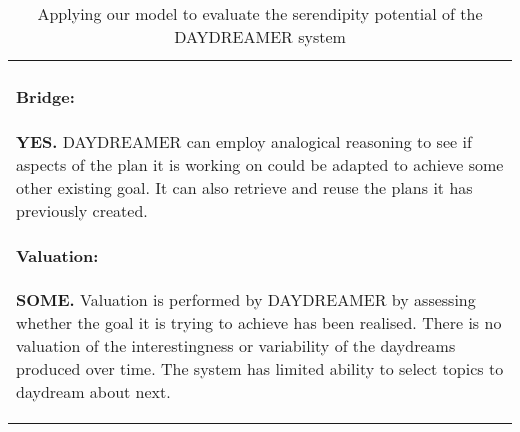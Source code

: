 \begin{table}
\begin{mdframed}[innertopmargin=-10pt]
\begin{tabular}{p{}}
\paragraph{Bridge:}
\textbf{YES.}  {\sf DAYDREAMER} can employ analogical reasoning to see
if aspects of the plan it is working on could be adapted to achieve
some other existing goal.  It can also retrieve and reuse the plans
it has previously created.
\paragraph{Valuation:}
\textbf{SOME.} Valuation is performed by {\sf DAYDREAMER} by assessing whether
the goal it is trying to achieve has been realised.  There is no valuation of the interestingness
or variability of the daydreams produced over time. 
The system has limited ability to select topics to daydream about next.
\end{tabular}
\end{mdframed}
\vspace{-.2cm}
\caption{Applying our model to evaluate the serendipity potential of the {\sf DAYDREAMER} system\label{ex:daydreamer}}
\end{table}

